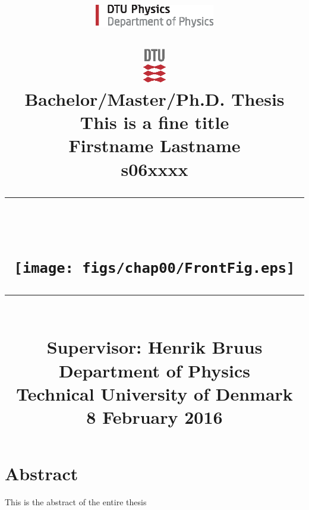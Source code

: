 \frontmatter

\vspace{10mm}
\title{\normalsize

%
\noindent
\begin{minipage}[b]{20mm} \includegraphics[height=10mm]{figs/chap00/DTU_Physics_logo.eps}\\[-1.5mm] \end{minipage}
\hfill \includegraphics[height=15mm]{figs/chap00/DTULogo.eps} \\[10mm]
%
{\normalsize Bachelor/Master/Ph.D. Thesis}\\[12mm]
%
{\bf\Huge This is a fine title}\\[10mm]
%
{\Large Firstname Lastname}\\
s06xxxx\\[15mm]
%
\rule{\textwidth}{0.5pt}\\[5mm]          %
\centerline{\texttt{[image: figs/chap00/FrontFig.eps]}} %
\rule{\textwidth}{0.5pt}\\[15mm]         %
Supervisor: Henrik Bruus\\[5mm]          %
Department of Physics\\                  %
Technical University of Denmark\\[3mm]   %
%
8 February 2016                         %
\date{}
} %

\maketitle




\chapter*{Abstract}
This is the abstract of the entire thesis
\\[20mm]

